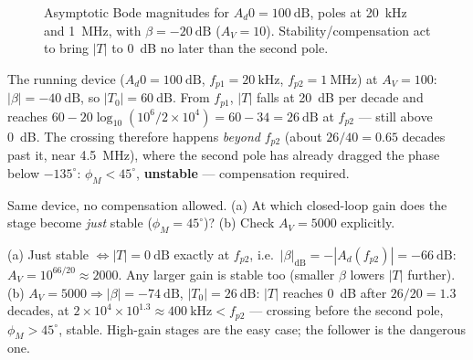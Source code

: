 \documentclass[11pt,a4paper,oneside]{book}
\newcommand{\Ad}{A_d}
\begin{document}
\begin{figure}[h]\centering
{}
\caption{Asymptotic Bode magnitudes for $\Ad0=\qty{100}{\dB}$, poles at
\qty{20}{\kilo\hertz} and \qty{1}{\mega\hertz}, with $\beta=\qty{-20}{\dB}$
($A_V=10$). Stability/compensation act to bring $|T|$ to \qty{0}{\dB} no later
than the second pole.}
\label{fig:bode}
\end{figure}

\begin{wexample}
The running device ($\Ad0=\qty{100}{\dB}$, $f_{p1}=\qty{20}{\kilo\hertz}$,
$f_{p2}=\qty{1}{\mega\hertz}$) at $A_V=100$: $|\beta|=\qty{-40}{\dB}$, so
$|T_0|=\qty{60}{\dB}$. From $f_{p1}$, $|T|$ falls at \qty{20}{\dB} per decade and
reaches $60-20\log_{10}(10^6/2\times10^4)=60-34=\qty{26}{\dB}$ at $f_{p2}$ ---
still above \qty{0}{\dB}. The crossing therefore happens \emph{beyond} $f_{p2}$
(about $26/40=0.65$ decades past it, near \qty{4.5}{\mega\hertz}), where the
second pole has already dragged the phase below $-135^\circ$:
$\phi_M<45^\circ$, \textbf{unstable} --- compensation required.
\end{wexample}

\begin{exercise}
Same device, no compensation allowed. (a) At which closed-loop gain does the
stage become \emph{just} stable ($\phi_M=45^\circ$)? (b) Check $A_V=5000$
explicitly.
\end{exercise}
\begin{solution}
(a) Just stable $\Leftrightarrow|T|=\qty{0}{\dB}$ exactly at $f_{p2}$, i.e.\
$|\beta|_{\mathrm{dB}}=-|\Ad(f_{p2})|=\qty{-66}{\dB}$:
$A_V=10^{66/20}\approx2000$. Any larger gain is stable too (smaller $\beta$
lowers $|T|$ further). (b) $A_V=5000\Rightarrow|\beta|=\qty{-74}{\dB}$,
$|T_0|=\qty{26}{\dB}$: $|T|$ reaches \qty{0}{\dB} after $26/20=1.3$ decades, at
$2\times10^4\times10^{1.3}\approx\qty{400}{\kilo\hertz}<f_{p2}$ --- crossing
before the second pole, $\phi_M>45^\circ$, stable. High-gain stages are the easy
case; the follower is the dangerous one.
\end{solution}
\end{document}
